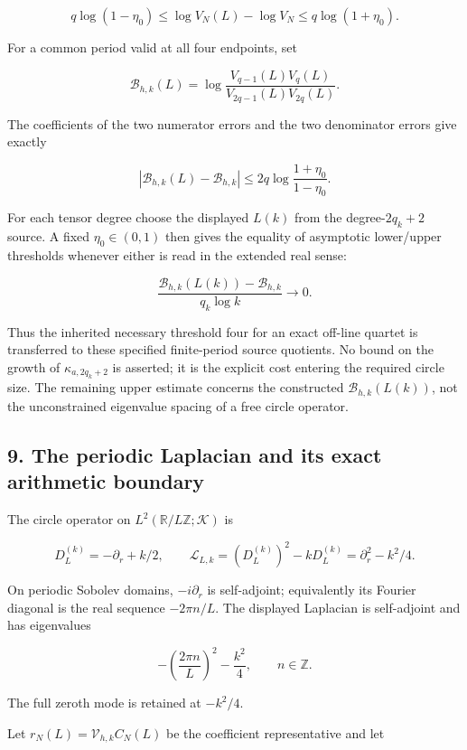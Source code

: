 \[
q\log(1-\eta_0)\le
\log V_N(L)-\log V_N
\le q\log(1+\eta_0).
\tag{P39}
\]

For a common period valid at all four endpoints, set

\[
\mathcal B_{h,k}(L)=
\log\frac{V_{q-1}(L)V_q(L)}{V_{2q-1}(L)V_{2q}(L)}.
\tag{P40}
\]

The coefficients of the two numerator errors and the two denominator errors give exactly

\[
\boxed{\left|\mathcal B_{h,k}(L)-\mathcal B_{h,k}\right|
\le2q\log\frac{1+\eta_0}{1-\eta_0}.}
\tag{P41}
\]

For each tensor degree choose the displayed \(L(k)\) from the degree-\(2q_k+2\) source. A fixed \(\eta_0\in(0,1)\) then gives the equality of asymptotic lower/upper thresholds whenever either is read in the extended real sense:

\[
\frac{\mathcal B_{h,k}(L(k))-\mathcal B_{h,k}}
{q_k\log k}\longrightarrow0.
\tag{P42}
\]

Thus the inherited necessary threshold four for an exact off-line quartet is transferred to these specified finite-period source quotients. No bound on the growth of \(\kappa_{a,2q_k+2}\) is asserted; it is the explicit cost entering the required circle size. The remaining upper estimate concerns the constructed \(\mathcal B_{h,k}(L(k))\), not the unconstrained eigenvalue spacing of a free circle operator.

\subsection{9. The periodic Laplacian and its exact arithmetic boundary}\label{endpoint-periodized_original--the-periodic-laplacian-and-its-exact-arithmetic-boundary}

The circle operator on \(L^2(\mathbb R/L\mathbb Z;\mathcal K)\) is

\[
D_L^{(k)}=-\partial_r+k/2,\qquad
\mathscr L_{L,k}=(D_L^{(k)})^2-kD_L^{(k)}
=\partial_r^2-k^2/4.
\tag{P43}
\]

On periodic Sobolev domains, \(-i\partial_r\) is self-adjoint; equivalently its Fourier diagonal is the real sequence \(-2\pi n/L\). The displayed Laplacian is self-adjoint and has eigenvalues

\[
-\left(\frac{2\pi n}{L}\right)^2-\frac{k^2}{4},\qquad n\in\mathbb Z.
\tag{P44}
\]

The full zeroth mode is retained at \(-k^2/4\).

Let \(r_N(L)=\mathcal V_{h,k}C_N(L)\) be the coefficient representative and let

